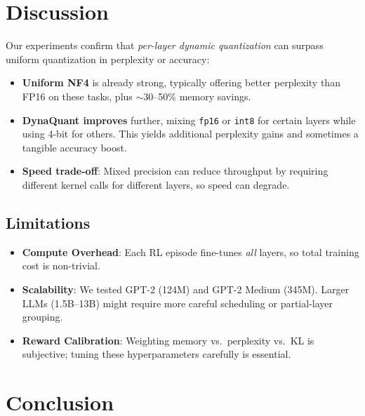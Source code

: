 \documentclass{article}
\begin{document}
	\section{Discussion}
	\label{sec:discussion}
	
	Our experiments confirm that \emph{per-layer dynamic quantization} can surpass uniform quantization in perplexity or accuracy:
	
	\begin{itemize}
		\item \textbf{Uniform NF4} is already strong, typically offering better perplexity than FP16 on these tasks, plus $\sim$30--50\% memory savings.
		\item \textbf{DynaQuant improves} further, mixing \texttt{fp16} or \texttt{int8} for certain layers while using 4-bit for others. This yields additional perplexity gains and sometimes a tangible accuracy boost.
		\item \textbf{Speed trade-off}: Mixed precision can reduce throughput by requiring different kernel calls for different layers, so speed can degrade.
	\end{itemize}
	
	\subsection{Limitations}
	\label{sec:limitations}
	
	\begin{itemize}
		\item \textbf{Compute Overhead}: Each RL episode fine-tunes \emph{all} layers, so total training cost is non-trivial.
		\item \textbf{Scalability}: We tested GPT-2 (124M) and GPT-2 Medium (345M). Larger LLMs (1.5B--13B) might require more careful scheduling or partial-layer grouping.
		\item \textbf{Reward Calibration}: Weighting memory vs.\ perplexity vs.\ KL is subjective; tuning these hyperparameters carefully is essential.
	\end{itemize}
	
	\section{Conclusion}
	\label{sec:conclusion}
	
\end{document}
